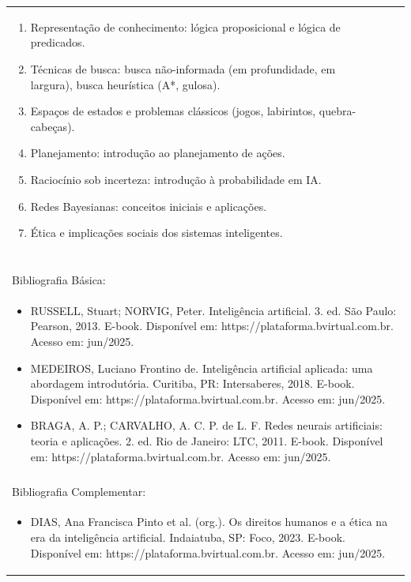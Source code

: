\documentclass[11pt]{article}
\begin{document}
\begin{center}
\begin{longtable}{|p{4cm}|p{4cm}|p{4cm}|p{4cm}|}
{\begin{enumerate}
\item Representação de conhecimento: lógica proposicional e lógica de predicados.
\item Técnicas de busca: busca não-informada (em profundidade, em largura), busca heurística (A*, gulosa).
\item Espaços de estados e problemas clássicos (jogos, labirintos, quebra-cabeças).
\item Planejamento: introdução ao planejamento de ações.
\item Raciocínio sob incerteza: introdução à probabilidade em IA.
\item Redes Bayesianas: conceitos iniciais e aplicações.
\item Ética e implicações sociais dos sistemas inteligentes.\end{enumerate}}\\
\multicolumn{4}{|p{16cm}|}{}\\
\multicolumn{4}{|p{16cm}|}{}\\
\multicolumn{4}{|p{16cm}|}{\vspace{-1cm}}\\
\multicolumn{4}{|p{16cm}|}{}\\
\hline
\multicolumn{4}{|p{16cm}|}{Bibliografia Básica:}\\
\multicolumn{4}{|p{16cm}|}{%
\begin{itemize}\item RUSSELL, Stuart; NORVIG, Peter. Inteligência artificial. 3. ed. São Paulo: Pearson, 2013. E-book. Disponível em: https://plataforma.bvirtual.com.br. Acesso em: jun/2025.
\item MEDEIROS, Luciano Frontino de. Inteligência artificial aplicada: uma abordagem introdutória. Curitiba, PR: Intersaberes, 2018. E-book. Disponível em: https://plataforma.bvirtual.com.br. Acesso em: jun/2025.
\item BRAGA, A. P.; CARVALHO, A. C. P. de L. F. Redes neurais artificiais: teoria e aplicações. 2. ed. Rio de Janeiro: LTC, 2011. E-book. Disponível em: https://plataforma.bvirtual.com.br. Acesso em: jun/2025.\end{itemize}}\\
\multicolumn{4}{|p{16cm}|}{}\\
\hline
\multicolumn{4}{|p{16cm}|}{Bibliografia Complementar:}\\
\multicolumn{4}{|p{16cm}|}{%
\begin{itemize}\item DIAS, Ana Francisca Pinto et al. (org.). Os direitos humanos e a ética na era da inteligência artificial. Indaiatuba, SP: Foco, 2023. E-book. Disponível em: https://plataforma.bvirtual.com.br. Acesso em: jun/2025.

\end{itemize}}
\end{longtable}
\end{center}
\end{document}

